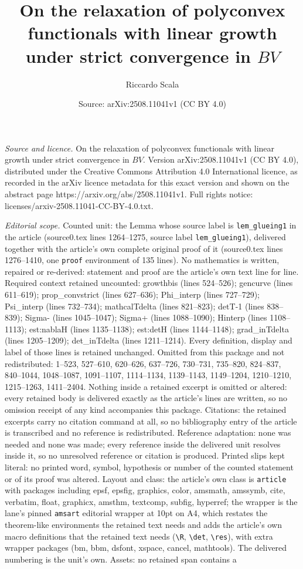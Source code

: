 \documentclass[10pt,a4paper]{amsart}
\title[On the relaxation of polyconvex functionals with linear grow]{On the relaxation of polyconvex functionals with linear growth under strict convergence in $BV$}
\author{Riccardo Scala}
\date{Source: arXiv:2508.11041v1 (CC BY 4.0)}
\begin{document}
\maketitle

\noindent\emph{Source and licence.} On the relaxation of polyconvex functionals with linear growth under strict convergence in $BV$. Version arXiv:2508.11041v1 (CC BY 4.0), distributed under the Creative Commons Attribution 4.0 International licence, as recorded in the arXiv licence metadata for this exact version and shown on the abstract page https://arxiv.org/abs/2508.11041v1. Full rights notice: licenses/arxiv-2508.11041-CC-BY-4.0.txt.\par\smallskip

\noindent\textit{Editorial scope.} Counted unit: the Lemma whose source label is \texttt{lem\_glueing1} in the article (source0.tex lines 1264--1275, source label \texttt{lem\_glueing1}), delivered together with the article's own complete original proof of it (source0.tex lines 1276--1410, one \texttt{proof} environment of 135 lines). No mathematics is written, repaired or re-derived: statement and proof are the article's own text line for line. Required context retained uncounted: growthbis (lines 524--526); gencurve (lines 611--619); prop\_convstrict (lines 627--636); Phi\_interp (lines 727--729); Psi\_interp (lines 732--734); mathcalTdelta (lines 821--823); detT-1 (lines 838--839); Sigma- (lines 1045--1047); Sigma+ (lines 1088--1090); Hinterp (lines 1108--1113); est:nablaH (lines 1135--1138); est:detH (lines 1144--1148); grad\_inTdelta (lines 1205--1209); det\_inTdelta (lines 1211--1214). Every definition, display and label of those lines is retained unchanged. Omitted from this package and not redistributed: 1--523, 527--610, 620--626, 637--726, 730--731, 735--820, 824--837, 840--1044, 1048--1087, 1091--1107, 1114--1134, 1139--1143, 1149--1204, 1210--1210, 1215--1263, 1411--2404. Nothing inside a retained excerpt is omitted or altered: every retained body is delivered exactly as the article's lines are written, so no omission receipt of any kind accompanies this package. Citations: the retained excerpts carry no citation command at all, so no bibliography entry of the article is transcribed and no reference is redistributed. Reference adaptation: none was needed and none was made; every reference inside the delivered unit resolves inside it, so no unresolved reference or citation is produced. Printed slips kept literal: no printed word, symbol, hypothesis or number of the counted statement or of its proof was altered. Layout and class: the article's own class is \texttt{article} with packages including epsf, epsfig, graphics, color, amsmath, amssymb, cite, verbatim, float, graphicx, amsthm, textcomp, subfig, hyperref; the wrapper is the lane's pinned \texttt{amsart} editorial wrapper at 10pt on A4, which restates the theorem-like environments the retained text needs and adds the article's own macro definitions that the retained text needs (\texttt{\textbackslash R}, \texttt{\textbackslash det}, \texttt{\textbackslash res}), with extra wrapper packages (bm, bbm, dsfont, xspace, cancel, mathtools). The delivered numbering is the unit's own. Assets: no retained span contains a 
\end{document}
